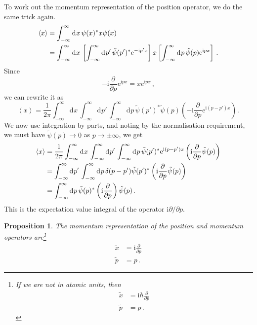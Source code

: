 \documentclass{article}
\theoremstyle{plain}\theoremheaderfont{\normalfont\itshape}\theorembodyfont{\rmfamily}\theoremseparator{.}\newtheorem*{rem}{Remark}\newtheorem*{ex}{Example}\newtheorem*{proof}{Proof}\newtheorem*{altp}{Alternative proof}
\theoremstyle{plain}\theoremheaderfont{\normalfont\bfseries}\theorembodyfont{\rmfamily}\theoremseparator{.}\newtheorem{thm}{Theorem}[section]\newtheorem{lem}[thm]{Lemma}\newtheorem{prop}[thm]{Proposition}\newtheorem*{cor}{Corollary}\newtheorem{defn}[thm]{Definition}\newtheorem{clm}[thm]{Claim}\newtheorem{clminproof}{Claim}
\theoremstyle{break}\theoremheaderfont{\normalfont\itshape}\theorembodyfont{\rmfamily}\theoremseparator{.\medskip}\newtheorem*{proofskip}{Proof}\newtheorem*{exs}{Examples}\newtheorem*{rems}{Remarks}
\theoremstyle{break}\theoremheaderfont{\normalfont\bfseries}\theorembodyfont{\rmfamily}\theoremseparator{.\medskip}\newtheorem{lemskip}[thm]{Lemma}\newtheorem{defnskip}[thm]{Definition}\newtheorem{propskip}[thm]{Proposition}\newtheorem{thmskip}[thm]{Theorem}
\numberwithin{equation}{section}
\newcommand{\ii}{\mathrm{i}}
\newcommand{\ee}{\mathrm{e}}
\newcommand{\dd}[2][]{\mathrm{d}^{#1} #2\,}
\newcommand{\pdv}[3][]{\frac{\partial^{#1} #2}{{\partial #3}^{#1}}}
\newcommand{\eval}[1]{\left\langle #1 \right\rangle}
\begin{document}
    To work out the momentum representation of the position operator, we do the same trick again.
    \begin{align}
        \eval{x}&=\int_{-\infty}^{\infty}\dd{x}\psi(x)^*x\psi(x)\notag\\
        &=\int_{-\infty}^{\infty}\dd{x}\left[\int_{-\infty}^{\infty}\dd{p'}\tilde{\psi}(p')^* \ee^{-\ii p'x}\right]x\left[\int_{-\infty}^{\infty}\dd{p}\tilde{\psi}(p) \ee^{\ii px}\right]\,.
    \end{align}
    Since
    \begin{equation}
        -\ii\pdv{}{p}\ee^{\ii px}=xe^{\ii px}\,,
    \end{equation}
    we can rewrite it as
    \begin{equation}
        \eval{x}=\frac{1}{2\pi}\int_{-\infty}^{\infty}\dd{x}\int_{-\infty}^{\infty}\dd{p'}\int_{-\infty}^{\infty}\dd{p}\tilde{\psi}(p')^*\tilde{\psi}(p)\left(-\ii\pdv{}{p}\ee^{\ii(p-p')x}\right)\,.
    \end{equation}
    We now use integration by parts, and noting by the normalisation requirement, we must have \(\tilde{\psi}(p)\to 0\) as \(p\to\pm\infty\), we get
    \begin{align}
        \eval{x}&=\frac{1}{2\pi}\int_{-\infty}^{\infty}\dd{x}\int_{-\infty}^{\infty}\dd{p'}\int_{-\infty}^{\infty}\dd{p}\tilde{\psi}(p')^*\ee^{\ii(p-p')x}\left(\ii\pdv{}{p}\tilde{\psi}(p)\right)\notag\\
        &=\int_{-\infty}^{\infty}\dd{p'}\int_{-\infty}^{\infty}\dd{p}\delta(p-p')\tilde{\psi}(p')^*\left(\ii\pdv{}{p}\tilde{\psi}(p)\right)\notag\\
        &=\int_{-\infty}^{\infty}\dd{p}\tilde{\psi}(p)^*\left(\ii\pdv{}{p}\right)\tilde{\psi}(p)\,.
    \end{align}
    This is the expectation value integral of the operator \(\ii\partial/\partial p\).

    \begin{prop}
        The momentum representation of the position and momentum operators are\footnote{If we are not in atomic units, then
        \begin{align}
            \tilde{x}&=\ii\hbar\pdv{}{p}\\
            \tilde{p}&=p\,.
        \end{align}
        }
        \begin{align}
            \tilde{x}&=\ii\pdv{}{p}\\
            \tilde{p}&=p\,.
        \end{align}
    \end{prop}
\end{document}
